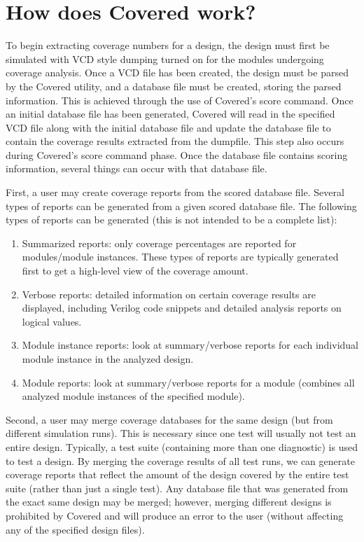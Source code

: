 \section{How does Covered work?}\label{page_howitworks}
 To begin extracting coverage numbers for a design, the design must first be simulated with VCD style dumping turned on for the modules undergoing coverage analysis. Once a VCD file has been created, the design must be parsed by the Covered utility, and a database file must be created, storing the parsed information. This is achieved through the use of Covered's score command. Once an initial database file has been generated, Covered will read in the specified  VCD file along with the initial database file and update the database file to contain the coverage results extracted from the dumpfile. This step also occurs during Covered's score command phase. Once the database file contains scoring information, several things can occur with that database file.

 First, a user may create coverage reports from the scored database file. Several types of reports can be generated from a given scored database file. The following types of reports can be generated (this is not intended to be a complete list):\begin{enumerate}
\item 
Summarized reports: only coverage percentages are reported for modules/module instances. These types of reports are typically generated first to get a high-level view of the coverage amount.\item 
Verbose reports: detailed information on certain coverage results are displayed, including Verilog code snippets and detailed analysis reports on logical values.\item 
Module instance reports: look at summary/verbose reports for each individual module instance in the analyzed design.\item 
Module reports: look at summary/verbose reports for a module (combines all analyzed module instances of the specified module).\end{enumerate}


 Second, a user may merge coverage databases for the same design (but from different simulation runs). This is necessary since one test will usually not test an entire design. Typically, a test suite  (containing more than one diagnostic) is used to test a design. By merging the coverage results of all test runs, we can generate coverage reports that reflect the amount of the design covered by the entire test suite (rather than just a single test). Any database file that was generated from the exact same design may be merged; however, merging different designs is prohibited by Covered and will produce an error to the user (without affecting any of the specified design files).


